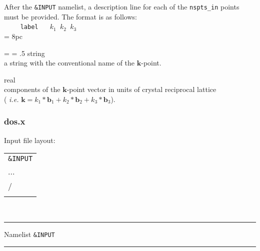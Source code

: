 \noindent After the {\tt \&INPUT} namelist, a description line for each of the
{\tt nspts\_in} points must be provided. The format is as follows:\\

\noindent $\qquad$ \texttt{label} $\quad$ {\tt $k_1$ $k_2$ $k_3$ } \\

\newdimen\descindent \descindent = 8pc
{\noindent \leftskip = \descindent \parskip = .5\baselineskip
{}%
{\sc string} \\ a string with the conventional name of the $\mathbf{k}$-point. \par

\noindent{}%
{\sc real} \\ components of the $\mathbf{k}$-point vector in units of crystal reciprocal
              lattice \\
              ( {\it i.e.} $ \mathbf{k} = k_1 * \mathbf{b}_1 + k_2 * \mathbf{b}_2 +
              k_3 * \mathbf{b}_3 $). \par
}\bigskip


\subsubsection{dos.x}
\noindent Input file layout: \\

%
%
\begin{tabular}{l}
 {\tt \&INPUT} \\
   ... \\
   / \\
  \\
\end{tabular}
%
%
\\

\begin{centering}
\rule{2.2in}{0.01in} Namelist {\tt \&INPUT} \rule{2.2in}{0.01in}
\end{centering}\\

